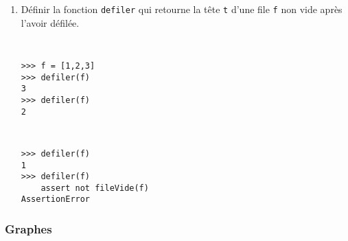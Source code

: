 \begin{question}
\begin{enumerate}
\item Définir la fonction \texttt{defiler} qui retourne la tête \texttt{t}
	d'une file \texttt{f} non vide après l'avoir défilée.

\noindent\begin{minipage}[t]{6cm}\tt\footnotesize
\begin{Verbatim}
>>> f = [1,2,3]
>>> defiler(f)
3
>>> defiler(f)
2
\end{Verbatim}
\end{minipage}
\hfill
\begin{minipage}[t]{6cm}\tt\footnotesize
\begin{Verbatim}
>>> defiler(f)
1
>>> defiler(f)
    assert not fileVide(f)
AssertionError
\end{Verbatim}
\end{minipage}
\vspace*{2mm}

\end{enumerate}

\end{question}

\subsubsection{Graphes}

